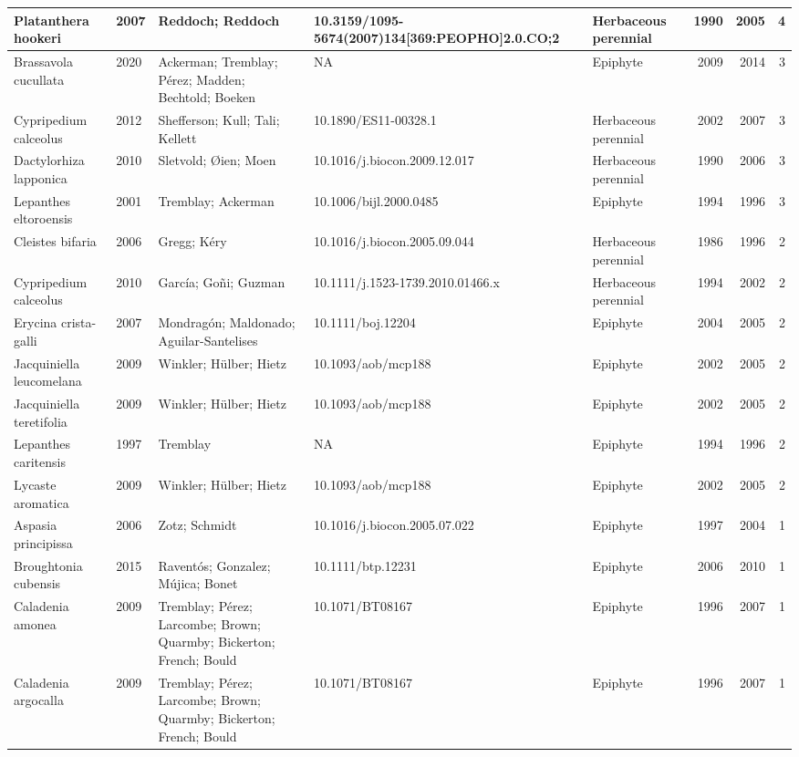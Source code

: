 \documentclass[
]{book}
\theoremstyle{definition}
\theoremstyle{definition}
\theoremstyle{definition}
\theoremstyle{definition}
\theoremstyle{remark}
\begin{document}
\begin{tabular}{l|l|l|l|l|r|r|r}
\hline
Platanthera hookeri & 2007 & Reddoch; Reddoch & 10.3159/1095-5674(2007)134[369:PEOPHO]2.0.CO;2 & Herbaceous perennial & 1990 & 2005 & 4\\
\hline
Brassavola cucullata & 2020 & Ackerman; Tremblay; Pérez; Madden; Bechtold; Boeken & NA & Epiphyte & 2009 & 2014 & 3\\
\hline
Cypripedium calceolus & 2012 & Shefferson; Kull; Tali; Kellett & 10.1890/ES11-00328.1 & Herbaceous perennial & 2002 & 2007 & 3\\
\hline
Dactylorhiza lapponica & 2010 & Sletvold; Øien; Moen & 10.1016/j.biocon.2009.12.017 & Herbaceous perennial & 1990 & 2006 & 3\\
\hline
Lepanthes eltoroensis & 2001 & Tremblay; Ackerman & 10.1006/bijl.2000.0485 & Epiphyte & 1994 & 1996 & 3\\
\hline
Cleistes bifaria & 2006 & Gregg; Kéry & 10.1016/j.biocon.2005.09.044 & Herbaceous perennial & 1986 & 1996 & 2\\
\hline
Cypripedium calceolus & 2010 & García; Goñi; Guzman & 10.1111/j.1523-1739.2010.01466.x & Herbaceous perennial & 1994 & 2002 & 2\\
\hline
Erycina crista-galli & 2007 & Mondragón; Maldonado; Aguilar-Santelises & 10.1111/boj.12204 & Epiphyte & 2004 & 2005 & 2\\
\hline
Jacquiniella leucomelana & 2009 & Winkler; Hülber; Hietz & 10.1093/aob/mcp188 & Epiphyte & 2002 & 2005 & 2\\
\hline
Jacquiniella teretifolia & 2009 & Winkler; Hülber; Hietz & 10.1093/aob/mcp188 & Epiphyte & 2002 & 2005 & 2\\
\hline
Lepanthes caritensis & 1997 & Tremblay & NA & Epiphyte & 1994 & 1996 & 2\\
\hline
Lycaste aromatica & 2009 & Winkler; Hülber; Hietz & 10.1093/aob/mcp188 & Epiphyte & 2002 & 2005 & 2\\
\hline
Aspasia principissa & 2006 & Zotz; Schmidt & 10.1016/j.biocon.2005.07.022 & Epiphyte & 1997 & 2004 & 1\\
\hline
Broughtonia cubensis & 2015 & Raventós; Gonzalez; Mújica; Bonet & 10.1111/btp.12231 & Epiphyte & 2006 & 2010 & 1\\
\hline
Caladenia amonea & 2009 & Tremblay; Pérez; Larcombe; Brown; Quarmby; Bickerton; French; Bould & 10.1071/BT08167 & Epiphyte & 1996 & 2007 & 1\\
\hline
Caladenia argocalla & 2009 & Tremblay; Pérez; Larcombe; Brown; Quarmby; Bickerton; French; Bould & 10.1071/BT08167 & Epiphyte & 1996 & 2007 & 1\\

\end{tabular}
\end{document}
